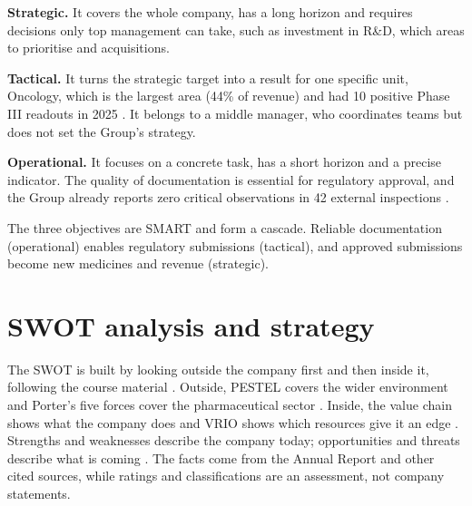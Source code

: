 \textbf{Strategic.} It covers the whole company, has a long horizon and requires decisions only top management can take, such as investment in R\&D, which areas to prioritise and acquisitions.

\textbf{Tactical.} It turns the strategic target into a result for one specific unit, Oncology, which is the largest area (44\% of revenue) \cite[p.~2]{AR} and had 10 positive Phase III readouts in 2025 \cite[p.~13]{AR}. It belongs to a middle manager, who coordinates teams but does not set the Group's strategy.

\textbf{Operational.} It focuses on a concrete task, has a short horizon and a precise indicator. The quality of documentation is essential for regulatory approval, and the Group already reports zero critical observations in 42 external inspections \cite[p.~4]{AR}.

\begin{analysis}
The three objectives are SMART and form a cascade. Reliable documentation (operational) enables regulatory submissions (tactical), and approved submissions become new medicines and revenue (strategic).
\end{analysis}

\section{SWOT analysis and strategy}
The SWOT is built by looking outside the company first and then inside it, following the course material \cite[pp.~17--29]{PLAN}. Outside, PESTEL covers the wider environment \cite[pp.~19--21]{PLAN} and Porter's five forces cover the pharmaceutical sector \cite[pp.~21--24]{PLAN}. Inside, the value chain shows what the company does \cite[p.~25]{PLAN} and VRIO shows which resources give it an edge \cite[p.~26]{PLAN}. Strengths and weaknesses describe the company today; opportunities and threats describe what is coming \cite[p.~27]{PLAN}. The facts come from the Annual Report and other cited sources, while ratings and classifications are an assessment, not company statements.

